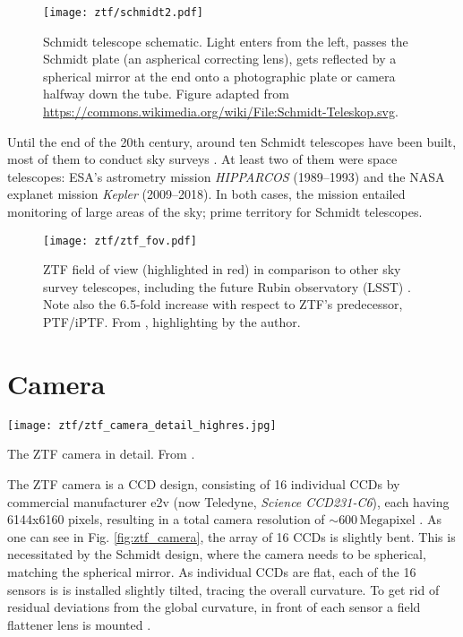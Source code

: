 \begin{figure}[]
    \texttt{[image: ztf/schmidt2.pdf]}
    \caption[Schmidt telescope schematic]{Schmidt telescope schematic. Light enters from the left, passes the Schmidt plate (an aspherical correcting lens), gets reflected by a spherical mirror at the end onto a photographic plate or camera halfway down the tube. Figure adapted from \url{https://commons.wikimedia.org/wiki/File:Schmidt-Teleskop.svg}.}
\end{figure}

Until the end of the 20th century, around ten Schmidt telescopes have been built, most of them to conduct sky surveys . At least two of them were space telescopes: ESA's astrometry mission \textit{HIPPARCOS}  (1989--1993) and the NASA explanet mission \textit{Kepler}  (2009--2018). In both cases, the mission entailed monitoring of large areas of the sky; prime territory for Schmidt telescopes.

\begin{figure}[]
    \texttt{[image: ztf/ztf\_fov.pdf]}
    \caption[ZTF Field of View]{ZTF field of view (highlighted in red) in comparison to other sky survey telescopes, including the future Rubin observatory (LSST) \cite{Ivezic2019}. Note also the 6.5-fold increase with respect to ZTF's predecessor, PTF/iPTF. From \cite{Laher2018}, highlighting by the author.}
\end{figure}



\section{Camera}
\begin{marginfigure}
    \texttt{[image: ztf/ztf\_camera\_detail\_highres.jpg]}
    \caption[ZTF camera cutaway]{The ZTF camera in detail. From \cite{Dekany2020}.}
\end{marginfigure}
The ZTF camera is a CCD design, consisting of 16 individual CCDs by commercial manufacturer e2v (now Teledyne, \textit{Science CCD231-C6}), each having 6144x6160 pixels, resulting in a total camera resolution of $\sim 600 \,\textrm{Megapixel}$ . As one can see in Fig. \ref{fig:ztf_camera}, the array of 16 CCDs is slightly bent. This is necessitated by the Schmidt design, where the camera needs to be spherical, matching the spherical mirror. As individual CCDs are flat, each of the 16 sensors is is installed slightly tilted, tracing the overall curvature. To get rid of residual deviations from the global curvature, in front of each sensor a field flattener lens is mounted .

